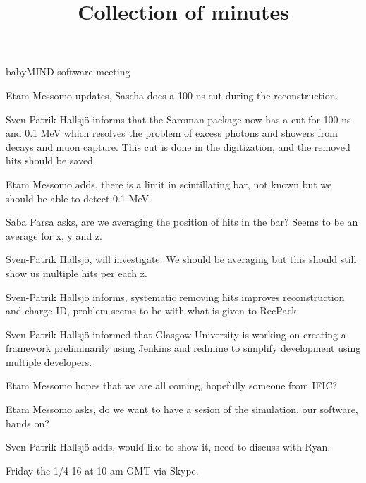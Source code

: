 \documentclass{article}
\title{Collection of minutes}
\author{\LaTeXe}
\begin{document}
\begin{Minutes}{babyMIND software meeting}
\maketitle

Etam Messomo updates, Sascha does a 100 ns cut during the reconstruction.

Sven-Patrik Hallsj\"o informs that the Saroman package now has a cut for 100 ns and 0.1 MeV which resolves the problem of excess photons and showers from decays and muon capture. This cut is done in the digitization, and the removed hits should be saved

Etam Messomo adds, there is a limit in scintillating bar, not known but we should be able to detect  0.1 MeV.

Saba Parsa asks, are we averaging the position of hits in the bar? Seems to be an average for x, y and z.

Sven-Patrik Hallsj\"o, will investigate. We should be averaging but this should still show us multiple hits per each z.

Sven-Patrik Hallsj\"o informs, systematic removing hits improves reconstruction and charge ID, problem seems to be with what is given to RecPack.

Sven-Patrik Hallsj\"o informed that Glasgow University is working on creating a framework preliminarily using Jenkins and redmine to simplify development using multiple developers. 

Etam Messomo hopes that we are all coming, hopefully someone from IFIC?

Etam Messomo asks, do we want to have a sesion of the simulation, our software, hands on?

Sven-Patrik Hallsj\"o adds, would like to show it, need to discuss with Ryan.

Friday the 1/4-16 at 10 am GMT via Skype.

\end{Minutes}
\end{document}
